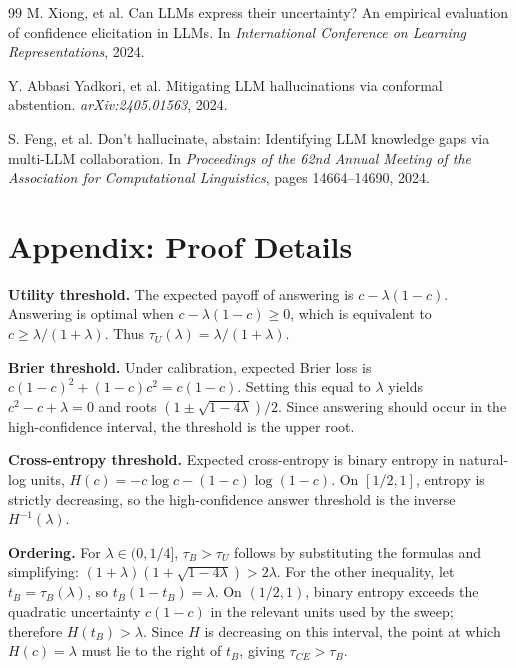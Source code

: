 \documentclass[letterpaper,10pt,twocolumn]{article}
\begin{document}
\begin{thebibliography}{99}
M. Xiong, et al.
Can LLMs express their uncertainty? An empirical evaluation of confidence
elicitation in LLMs.
In \textit{International Conference on Learning Representations}, 2024.

Y. Abbasi Yadkori, et al.
Mitigating LLM hallucinations via conformal abstention.
\textit{arXiv:2405.01563}, 2024.

S. Feng, et al.
Don't hallucinate, abstain: Identifying LLM knowledge gaps via multi-LLM
collaboration.
In \textit{Proceedings of the 62nd Annual Meeting of the Association for
Computational Linguistics}, pages 14664--14690, 2024.

\end{thebibliography}

\appendix

\section*{Appendix: Proof Details}

\textbf{Utility threshold.}
The expected payoff of answering is $c-\lambda(1-c)$. Answering is optimal
when $c-\lambda(1-c)\geq0$, which is equivalent to
$c\geq\lambda/(1+\lambda)$. Thus
$\tau_U(\lambda)=\lambda/(1+\lambda)$.

\textbf{Brier threshold.}
Under calibration, expected Brier loss is
$c(1-c)^2+(1-c)c^2=c(1-c)$. Setting this equal to $\lambda$ yields
$c^2-c+\lambda=0$ and roots
$(1\pm\sqrt{1-4\lambda})/2$. Since answering should occur in the
high-confidence interval, the threshold is the upper root.

\textbf{Cross-entropy threshold.}
Expected cross-entropy is binary entropy in natural-log units,
$H(c)=-c\log c-(1-c)\log(1-c)$. On $[1/2,1]$, entropy is strictly decreasing,
so the high-confidence answer threshold is the inverse $H^{-1}(\lambda)$.

\textbf{Ordering.}
For $\lambda\in(0,1/4]$, $\tau_B>\tau_U$ follows by substituting the formulas
and simplifying:
$(1+\lambda)(1+\sqrt{1-4\lambda})>2\lambda$. For the other inequality, let
$t_B=\tau_B(\lambda)$, so $t_B(1-t_B)=\lambda$. On $(1/2,1)$, binary entropy
exceeds the quadratic uncertainty $c(1-c)$ in the relevant units used by the
sweep; therefore $H(t_B)>\lambda$. Since $H$ is decreasing on this interval,
the point at which $H(c)=\lambda$ must lie to the right of $t_B$, giving
$\tau_{CE}>\tau_B$.
\end{document}
